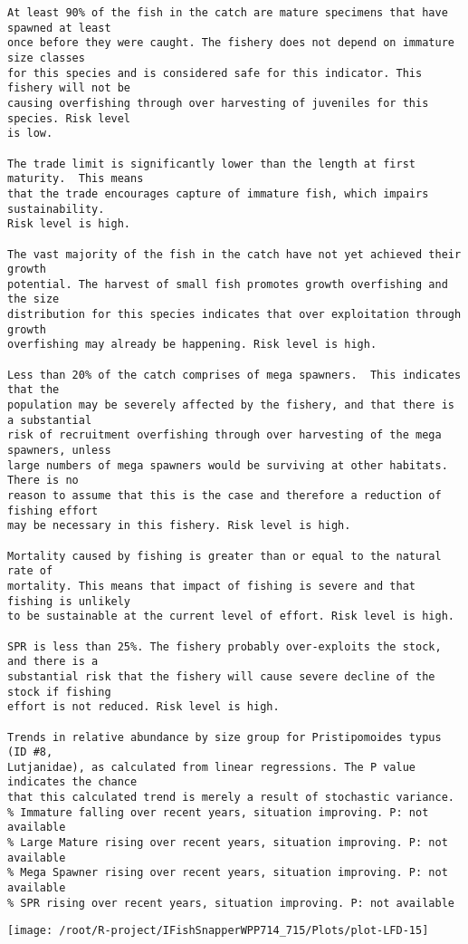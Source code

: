 \documentclass{report}\usepackage[]{graphicx}\usepackage[]{color}
\makeatletter
\def\maxwidth{ %
  \ifdim\Gin@nat@width>\linewidth
    \linewidth
  \else
    \Gin@nat@width
  \fi
}
\newenvironment{kframe}{%
 \def\at@end@of@kframe{}%
 \ifinner\ifhmode%
  \def\at@end@of@kframe{\end{minipage}}%
  \begin{minipage}{\columnwidth}%
 \fi\fi%
 \def\FrameCommand##1{\hskip\@totalleftmargin \hskip-\fboxsep
 \colorbox{shadecolor}{##1}\hskip-\fboxsep
     \hskip-\linewidth \hskip-\@totalleftmargin \hskip\columnwidth}%
 \MakeFramed {\advance\hsize-\width
   \@totalleftmargin\z@ \linewidth\hsize
   \@setminipage}}%
 {\par\unskip\endMakeFramed%
 \at@end@of@kframe}
\newenvironment{knitrout}{}{} %
\makeatother
\begin{document}
\begin{knitrout}
\begin{kframe}
\begin{verbatim}
At least 90% of the fish in the catch are mature specimens that have spawned at least
once before they were caught. The fishery does not depend on immature size classes
for this species and is considered safe for this indicator. This fishery will not be
causing overfishing through over harvesting of juveniles for this species. Risk level
is low.

The trade limit is significantly lower than the length at first maturity.  This means
that the trade encourages capture of immature fish, which impairs sustainability.
Risk level is high.

The vast majority of the fish in the catch have not yet achieved their growth
potential. The harvest of small fish promotes growth overfishing and the size
distribution for this species indicates that over exploitation through growth
overfishing may already be happening. Risk level is high.

Less than 20% of the catch comprises of mega spawners.  This indicates that the
population may be severely affected by the fishery, and that there is a substantial
risk of recruitment overfishing through over harvesting of the mega spawners, unless
large numbers of mega spawners would be surviving at other habitats. There is no
reason to assume that this is the case and therefore a reduction of fishing effort
may be necessary in this fishery. Risk level is high.
 
Mortality caused by fishing is greater than or equal to the natural rate of
mortality. This means that impact of fishing is severe and that fishing is unlikely
to be sustainable at the current level of effort. Risk level is high.
 
SPR is less than 25%. The fishery probably over-exploits the stock, and there is a
substantial risk that the fishery will cause severe decline of the stock if fishing
effort is not reduced. Risk level is high.
 
Trends in relative abundance by size group for Pristipomoides typus (ID #8,
Lutjanidae), as calculated from linear regressions. The P value indicates the chance
that this calculated trend is merely a result of stochastic variance.
% Immature falling over recent years, situation improving. P: not available
% Large Mature rising over recent years, situation improving. P: not available
% Mega Spawner rising over recent years, situation improving. P: not available
% SPR rising over recent years, situation improving. P: not available
\end{verbatim}
\end{kframe}
\texttt{[image: /root/R-project/IFishSnapperWPP714\_715/Plots/plot-LFD-15]} 


\end{knitrout}
\end{document}
